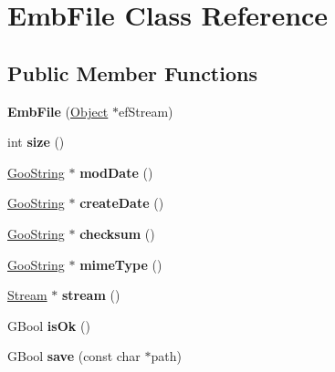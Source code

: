 \hypertarget{class_emb_file}{}\section{Emb\+File Class Reference}
\label{class_emb_file}
\subsection*{Public Member Functions}
\begin{DoxyCompactItemize}
\item 
\mbox{\label{class_emb_file_a3f9567888b8806b50f53e7cc9756e512}} 
{\bfseries Emb\+File} (\hyperlink{class_object}{Object} $\ast$ef\+Stream)
\item 
\mbox{\label{class_emb_file_a019da57bf288dd81d65575289074e03a}} 
int {\bfseries size} ()
\item 
\mbox{\label{class_emb_file_a6ad1420edae1bc84f82933a26b4f8c76}} 
\hyperlink{class_goo_string}{Goo\+String} $\ast$ {\bfseries mod\+Date} ()
\item 
\mbox{\label{class_emb_file_a31ab9b45539b4a986b49f1e93c57c13b}} 
\hyperlink{class_goo_string}{Goo\+String} $\ast$ {\bfseries create\+Date} ()
\item 
\mbox{\label{class_emb_file_a987a98739823596c6238432b6074f5d6}} 
\hyperlink{class_goo_string}{Goo\+String} $\ast$ {\bfseries checksum} ()
\item 
\mbox{\label{class_emb_file_ad2a77049cff7660eb9a8a5b441cdaac0}} 
\hyperlink{class_goo_string}{Goo\+String} $\ast$ {\bfseries mime\+Type} ()
\item 
\mbox{\label{class_emb_file_a40f7d69c8afc366a3f8b106e7174aa5c}} 
\hyperlink{class_stream}{Stream} $\ast$ {\bfseries stream} ()
\item 
\mbox{\label{class_emb_file_a1a4e1c2aa3d72221b7ad102f32ad134a}} 
G\+Bool {\bfseries is\+Ok} ()
\item 
\mbox{\label{class_emb_file_adf253bd393092a41057b36c392aedbe1}} 
G\+Bool {\bfseries save} (const char $\ast$path)
\end{DoxyCompactItemize}


